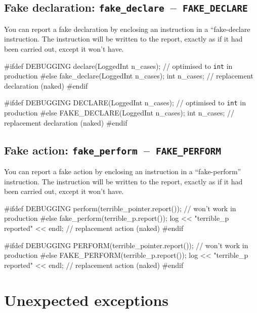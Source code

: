 \documentclass[twoside, a4paper, article]{memoir}
\newcommand*\testudocolor{\color{red!80!blue}}
\newcommand*\testudo[1]{\texttt{\testudocolor{}#1}}
\newcommand*\testudopair[2]{\testudo{#1}~--~\testudo{#2}}
\begin{document}
\subsection{Fake declaration:
  \testudopair{fake\_declare}{FAKE\_DECLARE}}
\label{sec:fake-action}

You can report a fake declaration by enclosing an instruction in a
``fake-declare instruction.  The instruction will be written to the report,
exactly as if it had been carried out, except it won't have.
\begin{cpplisting}
#ifdef DEBUGGING
declare(LoggedInt n_cases); // optimised to \texttt{int} in production
#else
fake_declare(LoggedInt n_cases);
int n_cases; // replacement declaration (naked)
#endif
\end{cpplisting}

\begin{cpplisting}
#ifdef DEBUGGING
DECLARE(LoggedInt n_cases); // optimised to \texttt{int} in production
#else
FAKE_DECLARE(LoggedInt n_cases);
int n_cases; // replacement declaration (naked)
#endif
\end{cpplisting}


\subsection{Fake action:
  \testudopair{fake\_perform}{FAKE\_PERFORM}}
\label{sec:fake-action}

You can report a fake action by enclosing an instruction in a ``fake-perform''
instruction.  The instruction will be written to the report, exactly as if it
had been carried out, except it won't have.
\begin{cpplisting}
#ifdef DEBUGGING
perform(terrible_pointer.report()); // won't work in production
#else
fake_perform(terrible_p.report());
log << "terrible_p reported" << endl; // replacement action (naked)
#endif
\end{cpplisting}

\begin{cpplisting}
#ifdef DEBUGGING
PERFORM(terrible_pointer.report()); // won't work in production
#else
FAKE_PERFORM(terrible_p.report());
log << "terrible_p reported" << endl; // replacement action (naked)
#endif
\end{cpplisting}


\section{Unexpected exceptions}
\label{sec:unexpected-exceptions}
\end{document}
